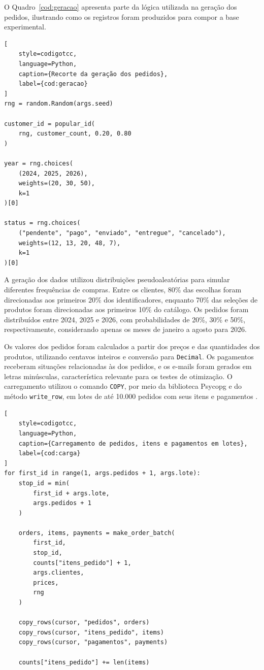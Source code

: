 \documentclass{UNESC}
\newcommand{\codigo}[1]{\texttt{#1}}
\begin{document}
O Quadro~\ref{cod:geracao} apresenta parte da lógica utilizada na geração dos pedidos, ilustrando como os registros foram produzidos para compor a base experimental.



\begin{lstlisting}[
    style=codigotcc,
    language=Python,
    caption={Recorte da geração dos pedidos},
    label={cod:geracao}
]
rng = random.Random(args.seed)

customer_id = popular_id(
    rng, customer_count, 0.20, 0.80
)

year = rng.choices(
    (2024, 2025, 2026),
    weights=(20, 30, 50),
    k=1
)[0]

status = rng.choices(
    ("pendente", "pago", "enviado", "entregue", "cancelado"),
    weights=(12, 13, 20, 48, 7),
    k=1
)[0]
\end{lstlisting}


A geração dos dados utilizou distribuições pseudoaleatórias para simular diferentes frequências de compras. Entre os clientes, 80\% das escolhas foram direcionadas aos primeiros 20\% dos identificadores, enquanto 70\% das seleções de produtos foram direcionadas aos primeiros 10\% do catálogo. Os pedidos foram distribuídos entre 2024, 2025 e 2026, com probabilidades de 20\%, 30\% e 50\%, respectivamente, considerando apenas os meses de janeiro a agosto para 2026.

Os valores dos pedidos foram calculados a partir dos preços e das quantidades dos produtos, utilizando centavos inteiros e conversão para \codigo{Decimal}. Os pagamentos receberam situações relacionadas às dos pedidos, e os e-mails foram gerados em letras minúsculas, característica relevante para os testes de otimização. O carregamento utilizou o comando \codigo{COPY}, por meio da biblioteca Psycopg e do método \codigo{write\_row}, em lotes de até 10.000 pedidos com seus itens e pagamentos \cite{postgresql2025populate,psycopgcopy}.

\begin{lstlisting}[
    style=codigotcc,
    language=Python,
    caption={Carregamento de pedidos, itens e pagamentos em lotes},
    label={cod:carga}
]
for first_id in range(1, args.pedidos + 1, args.lote):
    stop_id = min(
        first_id + args.lote,
        args.pedidos + 1
    )

    orders, items, payments = make_order_batch(
        first_id,
        stop_id,
        counts["itens_pedido"] + 1,
        args.clientes,
        prices,
        rng
    )

    copy_rows(cursor, "pedidos", orders)
    copy_rows(cursor, "itens_pedido", items)
    copy_rows(cursor, "pagamentos", payments)

    counts["itens_pedido"] += len(items)
\end{lstlisting}
\end{document}
